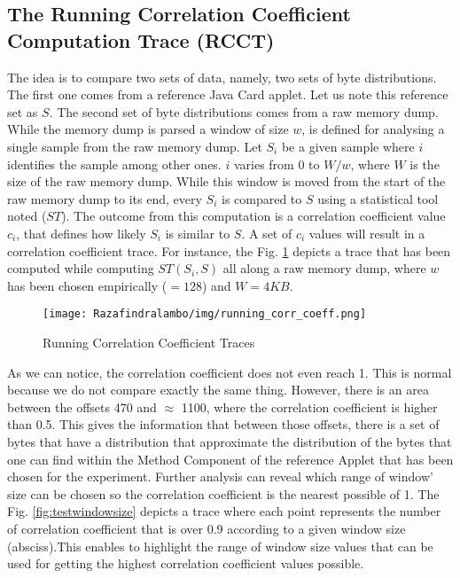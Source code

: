 \subsection{The Running Correlation Coefficient Computation Trace (RCCT)}
The idea is to compare two sets of data, namely, two sets of byte distributions. The first one comes from a reference Java Card applet. Let us note this reference set as $S$. The second set of byte distributions comes from a raw memory dump. While the memory dump is parsed a window of size $w$, is defined for analysing a single sample from the raw memory dump. Let $S_i$ be a given sample where $i$ identifies the sample among other ones. $i$ varies from $0$ to $W/w$, where $W$ is the size of the raw memory dump. While this window is moved from the start of the raw memory dump to its end, every $S_i$ is compared to $S$ using a statistical tool noted ($ST$). The outcome from this computation is a correlation coefficient value $c_i$, that defines how likely $S_i$ is similar to $S$. A set of $c_i$ values will result in a correlation coefficient trace.
For instance, the Fig. \ref{fig:runncorrcoeff} depicts a trace that has been computed while computing $ST(S_i, S)$ all along a raw memory dump, where $w$ has been chosen empirically ($=128$) and $W = 4KB$. 
\begin{figure}[!h]
    \center
    \texttt{[image: Razafindralambo/img/running\_corr\_coeff.png]}
    \caption{Running Correlation Coefficient Traces}
    \label{fig:runncorrcoeff}
\end{figure}

As we can notice, the correlation coefficient does not even reach 1. This is normal because we do not compare exactly the same thing. However, there is an area between the offsets 470 and $\approx$ 1100, where the correlation coefficient is higher than 0.5. This gives the information that between those offsets, there is a set of bytes that have a distribution that approximate the distribution of the bytes that one can find within the Method Component of the reference Applet that has been chosen for the experiment. Further analysis can reveal which range of window' size can be chosen so the
correlation coefficient is the nearest possible of 1. The Fig. \ref{fig:testwindowsize} depicts a trace where each point represents the number of correlation coefficient that is over 0.9 according to a given window size (absciss).This enables to highlight the range of window size values that can be used for getting the highest correlation coefficient values possible.

